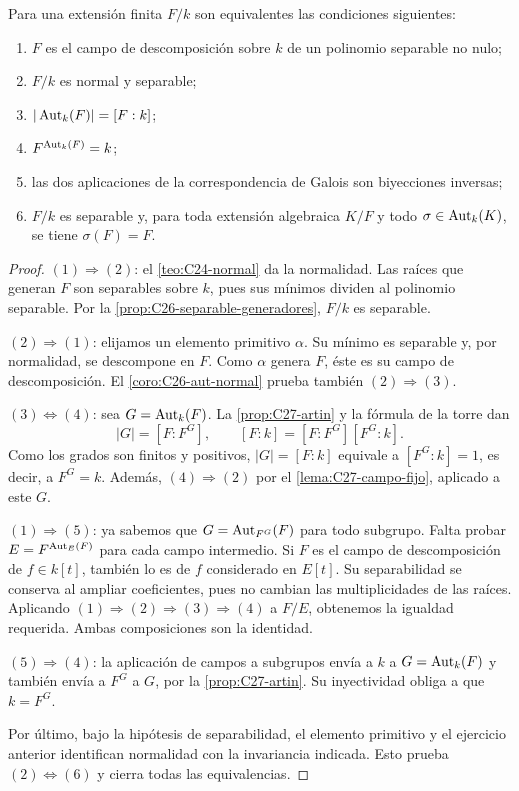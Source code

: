 \begin{teo}\label{teo:C27-galois}
Para una extensión finita $F/k$ son equivalentes las condiciones siguientes:
\begin{enumerate}[label=(\arabic*),nosep]
\item $F$ es el campo de descomposición sobre $k$ de un polinomio separable no nulo;
\item $F/k$ es normal y separable;
\item $|\operatorname{Aut}_k(F)|=[F:k]$;
\item $F^{\operatorname{Aut}_k(F)}=k$;
\item las dos aplicaciones de la correspondencia de Galois son biyecciones inversas;
\item $F/k$ es separable y, para toda extensión algebraica $K/F$ y todo $\sigma\in\operatorname{Aut}_k(K)$, se tiene $\sigma(F)=F$.
\end{enumerate}
\end{teo}
\begin{proof}
$(1)\Rightarrow(2)$: el \cref{teo:C24-normal} da la normalidad. Las raíces que generan $F$ son separables sobre $k$, pues sus mínimos dividen al polinomio separable. Por la \cref{prop:C26-separable-generadores}, $F/k$ es separable.

$(2)\Rightarrow(1)$: elijamos un elemento primitivo $\alpha$. Su mínimo es separable y, por normalidad, se descompone en $F$. Como $\alpha$ genera $F$, éste es su campo de descomposición. El \cref{coro:C26-aut-normal} prueba también $(2)\Rightarrow(3)$.

$(3)\Leftrightarrow(4)$: sea $G=\operatorname{Aut}_k(F)$. La \cref{prop:C27-artin} y la fórmula de la torre dan
\[
|G|=[F:F^G],\qquad [F:k]=[F:F^G][F^G:k].
\]
Como los grados son finitos y positivos, $|G|=[F:k]$ equivale a $[F^G:k]=1$, es decir, a $F^G=k$. Además, $(4)\Rightarrow(2)$ por el \cref{lema:C27-campo-fijo}, aplicado a este $G$.

$(1)\Rightarrow(5)$: ya sabemos que $G=\operatorname{Aut}_{F^G}(F)$ para todo subgrupo. Falta probar $E=F^{\operatorname{Aut}_E(F)}$ para cada campo intermedio. Si $F$ es el campo de descomposición de $f\in k[t]$, también lo es de $f$ considerado en $E[t]$. Su separabilidad se conserva al ampliar coeficientes, pues no cambian las multiplicidades de las raíces. Aplicando $(1)\Rightarrow(2)\Rightarrow(3)\Rightarrow(4)$ a $F/E$, obtenemos la igualdad requerida. Ambas composiciones son la identidad.

$(5)\Rightarrow(4)$: la aplicación de campos a subgrupos envía a $k$ a $G=\operatorname{Aut}_k(F)$ y también envía a $F^G$ a $G$, por la \cref{prop:C27-artin}. Su inyectividad obliga a que $k=F^G$.

Por último, bajo la hipótesis de separabilidad, el elemento primitivo y el ejercicio anterior identifican normalidad con la invariancia indicada. Esto prueba $(2)\Leftrightarrow(6)$ y cierra todas las equivalencias.
\end{proof}

